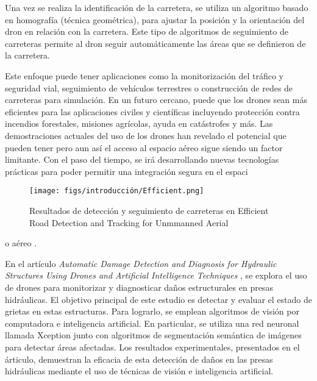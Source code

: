 Una vez se realiza la identificación de la carretera, se utiliza un algoritmo basado en homografía (técnica geométrica), para ajustar la posición y la orientación del dron
en relación con la carretera. Este tipo de algoritmos de seguimiento de carreteras permite al dron seguir automáticamente las áreas que se definieron de la carretera. 

Este enfoque puede tener aplicaciones como la monitorización del tráfico y seguridad vial, seguimiento de vehículos terrestres o construcción de redes de carreteras para simulación. En un futuro cercano, puede que los drones sean más eficientes para las aplicaciones civiles y científicas incluyendo protección contra incendios forestales, misiones agrícolas, 
ayuda en catástrofes y más. 
Las demostraciones actuales del uso de los drones han revelado el potencial que pueden tener pero aun así el acceso al espacio aéreo sigue siendo un factor limitante. Con el paso del 
tiempo, se irá desarrollando nuevas tecnologías prácticas para poder permitir una integración segura en el espaci

\begin{figure} [H]
  \begin{center}
    \texttt{[image: figs/introducción/Efficient.png]}
  \end{center}
  \caption{Resultados de detección y seguimiento de carreteras en Efficient Road Detection and Tracking for Unmmanned Aerial \cite{article}}
  \label{fig:Efficient}
  \vspace{-1.5em}
\end{figure}

o aéreo \cite{KrejciGarzon_2014}. 

En el artículo \textit{Automatic Damage Detection and Diagnosis for Hydraulic Structures Using Drones and Artificial Intelligence Techniques} \cite{rs15030615}, se explora el uso de drones
para monitorizar y diagnosticar daños estructurales en presas hidráulicas. El objetivo principal de este estudio es detectar y evaluar el estado de  grietas en estas estructuras. Para lograrlo, 
se emplean algoritmos de visión por computadora e inteligencia artificial. 
En particular, se utiliza una red neuronal llamada Xception \cite{Deeplabv3} junto con algoritmos de segmentación semántica de imágenes para detectar áreas afectadas. Los resultados experimentales, 
presentados en el árticulo, demuestran la eficacia de esta detección de daños en las presas hidráulicas mediante el uso de técnicas de visión e inteligencia artificial. 


